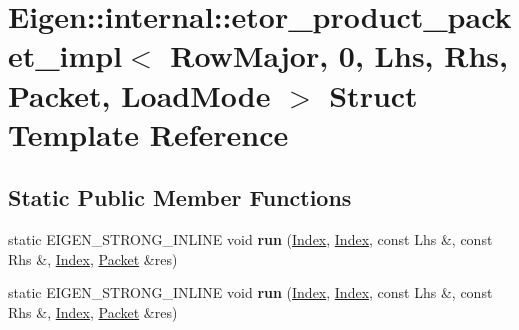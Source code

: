 \hypertarget{struct_eigen_1_1internal_1_1etor__product__packet__impl_3_01_row_major_00_010_00_01_lhs_00_01_rhef6a3dfb35b15ca62240d6e9f69cec51}{}\section{Eigen\+:\+:internal\+:\+:etor\+\_\+product\+\_\+packet\+\_\+impl$<$ Row\+Major, 0, Lhs, Rhs, Packet, Load\+Mode $>$ Struct Template Reference}
\label{struct_eigen_1_1internal_1_1etor__product__packet__impl_3_01_row_major_00_010_00_01_lhs_00_01_rhef6a3dfb35b15ca62240d6e9f69cec51}
\subsection*{Static Public Member Functions}
\begin{DoxyCompactItemize}
\item 
\mbox{\label{struct_eigen_1_1internal_1_1etor__product__packet__impl_3_01_row_major_00_010_00_01_lhs_00_01_rhef6a3dfb35b15ca62240d6e9f69cec51_a0fa4979b5d3eb62ac957e9db3a7b444a}} 
static E\+I\+G\+E\+N\+\_\+\+S\+T\+R\+O\+N\+G\+\_\+\+I\+N\+L\+I\+NE void {\bfseries run} (\hyperlink{namespace_eigen_a62e77e0933482dafde8fe197d9a2cfde}{Index}, \hyperlink{namespace_eigen_a62e77e0933482dafde8fe197d9a2cfde}{Index}, const Lhs \&, const Rhs \&, \hyperlink{namespace_eigen_a62e77e0933482dafde8fe197d9a2cfde}{Index}, \hyperlink{union_eigen_1_1internal_1_1_packet}{Packet} \&res)
\item 
\mbox{\label{struct_eigen_1_1internal_1_1etor__product__packet__impl_3_01_row_major_00_010_00_01_lhs_00_01_rhef6a3dfb35b15ca62240d6e9f69cec51_a0fa4979b5d3eb62ac957e9db3a7b444a}} 
static E\+I\+G\+E\+N\+\_\+\+S\+T\+R\+O\+N\+G\+\_\+\+I\+N\+L\+I\+NE void {\bfseries run} (\hyperlink{namespace_eigen_a62e77e0933482dafde8fe197d9a2cfde}{Index}, \hyperlink{namespace_eigen_a62e77e0933482dafde8fe197d9a2cfde}{Index}, const Lhs \&, const Rhs \&, \hyperlink{namespace_eigen_a62e77e0933482dafde8fe197d9a2cfde}{Index}, \hyperlink{union_eigen_1_1internal_1_1_packet}{Packet} \&res)
\end{DoxyCompactItemize}


